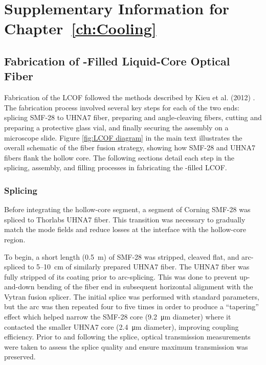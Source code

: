 \doublespacing
\chapter{Supplementary Information for Chapter~\ref{ch:Cooling}}
\label{Cooling:Appendix}
\acresetall

\section{Fabrication of \texorpdfstring{}{CS2}-Filled Liquid-Core Optical Fiber}
\label{Cooling:Appendix:sec:FabricationofCS2FilledLCOF}

Fabrication of the \ac{LCOF} followed the methods described by Kieu et al. (2012) \cite{kieu2012integrated}. The fabrication process involved several key steps for each of the two ends: splicing \ac{SMF-28} to \ac{UHNA7} fiber, preparing and angle-cleaving fibers, cutting and preparing a protective glass vial, and finally securing the assembly on a microscope slide. Figure \ref{fig:LCOF diagram} in the main text illustrates the overall schematic of the fiber fusion strategy, showing how \ac{SMF-28} and \ac{UHNA7} fibers flank the hollow core. The following sections detail each step in the splicing, assembly, and filling processes in fabricating the -filled \ac{LCOF}.

\subsection{Splicing}
\label{Cooling:Appendix:subsec:Splicing}

Before integrating the hollow-core segment, a segment of Corning \ac{SMF-28} was spliced to Thorlabs \ac{UHNA7} fiber. This transition was necessary to gradually match the mode fields and reduce losses at the interface with the hollow-core region.

To begin, a short length (\SI{0.5}{\meter}) of \ac{SMF-28} was stripped, cleaved flat, and arc-spliced to 5–\SI{10}{\centi\meter} of similarly prepared \ac{UHNA7} fiber. The \ac{UHNA7} fiber was fully stripped of its coating prior to arc-splicing. This was done to prevent up-and-down bending of the fiber end in subsequent horizontal alignment with the Vytran fusion splicer. The initial splice was performed with standard parameters, but the arc was then repeated four to five times in order to produce a “tapering” effect which helped narrow the \ac{SMF-28} core (\SI{9.2}{\micro\meter} diameter) where it contacted the smaller \ac{UHNA7} core (\SI{2.4}{\micro\meter} diameter), improving coupling efficiency. Prior to and following the splice, optical transmission measurements were taken to assess the splice quality and ensure maximum transmission was preserved.

